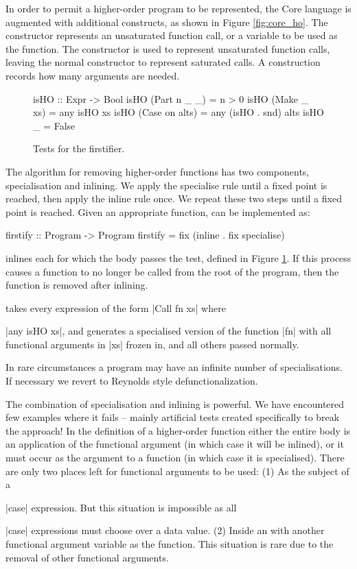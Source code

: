 In order to permit a higher-order program to be represented, the Core language is augmented with additional constructs, as shown in Figure \ref{fig:core_ho}. The  constructor represents an unsaturated function call, or a variable to be used as the function. The  constructor is used to represent unsaturated function calls, leaving the normal  constructor to represent saturated calls. A  construction records how many arguments are needed.

\begin{figure}
\ignore\begin{code}
isHO :: Expr -> Bool
isHO (Part n _ _)    = n > 0
isHO (Make _ xs)     = any isHO xs
isHO (Case on alts)  = any (isHO . snd) alts
isHO _               = False
\end{code}
\caption{Tests for the firstifier.}
\label{fig:isHO}
\figureend
\end{figure}

The algorithm for removing higher-order functions has two components, specialisation and inlining. We apply the specialise rule until a fixed point is reached, then apply the inline rule once. We repeat these two steps until a fixed point is reached. Given an appropriate  function,  can be implemented as:

\ignore\begin{code}
firstify :: Program -> Program
firstify = fix (inline . fix specialise)
\end{code}

 inlines each  for which the body passes the  test, defined in Figure \ref{fig:isHO}. If this process causes a function to no longer be called from the root of the program, then the function is removed after inlining.

 takes every expression of the form |Call fn xs| where \ignore|any isHO xs|, and generates a specialised version of the function |fn| with all functional arguments in |xs| frozen in, and all others passed normally.

In rare circumstances a program may have an infinite number of specialisations. If necessary we revert to Reynolds style defunctionalization.

The combination of specialisation and inlining is powerful. We have encountered few examples where it fails -- mainly artificial tests created specifically to break the approach! In the definition of a higher-order function either the entire body is an application of the functional argument (in which case it will be inlined), or it must occur as the argument to a function (in which case it is specialised). There are only two places left for functional arguments to be used: (1) As the subject of a \ignore|case| expression. But this situation is impossible as all \ignore|case| expressions must choose over a data value. (2) Inside an  with another functional argument variable as the function. This situation is rare due to the removal of other functional arguments.

